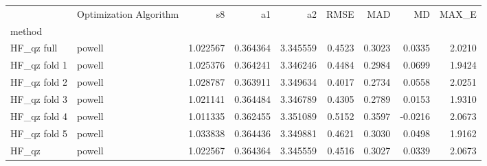\begin{tabular}{llrrrrrrr}
 & Optimization Algorithm & s8 & a1 & a2 & RMSE & MAD & MD & MAX_E \\
method &  &  &  &  &  &  &  &  \\
HF_qz full & powell & 1.022567 & 0.364364 & 3.345559 & 0.4523 & 0.3023 & 0.0335 & 2.0210 \\
HF_qz fold 1 & powell & 1.025376 & 0.364241 & 3.346246 & 0.4484 & 0.2984 & 0.0699 & 1.9424 \\
HF_qz fold 2 & powell & 1.028787 & 0.363911 & 3.349634 & 0.4017 & 0.2734 & 0.0558 & 2.0251 \\
HF_qz fold 3 & powell & 1.021141 & 0.364484 & 3.346789 & 0.4305 & 0.2789 & 0.0153 & 1.9310 \\
HF_qz fold 4 & powell & 1.011335 & 0.362455 & 3.351089 & 0.5152 & 0.3597 & -0.0216 & 2.0673 \\
HF_qz fold 5 & powell & 1.033838 & 0.364436 & 3.349881 & 0.4621 & 0.3030 & 0.0498 & 1.9162 \\
HF_qz & powell & 1.022567 & 0.364364 & 3.345559 & 0.4516 & 0.3027 & 0.0339 & 2.0673 \\
\end{tabular}
